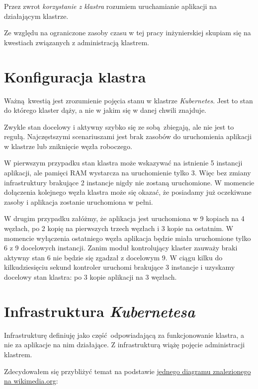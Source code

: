 \documentclass[a4paper,12pt,twoside,openany]{report}
\begin{document}
Przez zwrot \emph{korzystanie z klastra} rozumiem uruchamianie aplikacji
na działającym klastrze.

Ze względu na ograniczone zasoby czasu w tej pracy inżynierskiej skupiam
się na kwestiach związanych z administracją klastrem.

\hypertarget{konfiguracja-klastra}{%
\section{Konfiguracja klastra}\label{konfiguracja-klastra}}

Ważną~kwestią jest zrozumienie pojęcia stanu w klastrze
\emph{Kubernetes}. Jest to stan do którego klaster dąży, a nie w jakim
się w danej chwili znajduje.

Zwykle stan docelowy i aktywny szybko się ze sobą~zbiegają, ale nie jest
to regułą. Najczęstszymi scenariuszami jest brak zasobów do uruchomienia
aplikacji w klastrze lub zniknięcie węzła roboczego.

W pierwszym przypadku stan klastra może wskazywać na istnienie 5
instancji aplikacji, ale pamięci RAM wystarcza na uruchomienie tylko 3.
Więc bez zmiany infrastruktury brakujące 2 instancje nigdy nie zostaną
uruchomione. W momencie dołączenia kolejnego węzła klastra może się
okazać, że posiadamy już oczekiwane zasoby i aplikacja zostanie
uruchomiona w pełni.

W drugim przypadku załóżmy, że aplikacja jest uruchomiona w 9 kopiach na
4 węzłach, po 2 kopię na pierwszych trzech węzłach i 3 kopie na
ostatnim. W momencie wyłączenia ostatniego węzła aplikacja będzie miała
uruchomione tylko 6 z 9 docelowych instancji. Zanim moduł kontrolujący
klaster zauważy braki aktywny stan 6 nie będzie się zgadzał z docelowym
9. W ciągu kilku do kilkudziesięciu sekund kontroler uruchomi brakujące
3 instancje i uzyskamy docelowy stan klastra: po 3 kopie aplikacji na 3
węzłach.

\hypertarget{infrastruktura-kubernetesa}{%
\section{\texorpdfstring{Infrastruktura
\emph{Kubernetesa}}{Infrastruktura Kubernetesa}}\label{infrastruktura-kubernetesa}}

Infrastrukturę definiuję jako część~odpowiadającą za funkcjonowanie
klastra, a nie za aplikacje na nim działające. Z infrastrukturą wiążę
pojęcie administracji klastrem.

Zdecydowałem się przybliżyć temat na podstawie
\href{https://commons.wikimedia.org/wiki/File:Kubernetes.png}{jednego
diagramu znalezionego na wikimedia.org}:
\end{document}
